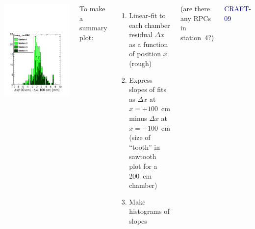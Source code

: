 \documentclass[compress]{beamer}
\begin{document}
\begin{frame}
\begin{columns}
\includegraphics[width=\linewidth]{sawtooth_low_norpc.pdf}

To make a summary plot:

\begin{enumerate}
\item Linear-fit to each chamber residual $\Delta x$ as a function of position $x$ (rough)

\item Express slopes of fits as $\Delta x$ at $x=+100$~cm minus
  $\Delta x$ at $x=-100$~cm \\ (size of ``tooth'' in sawtooth
  plot for a 200~cm chamber)

\item Make histograms of slopes
\end{enumerate}

\vspace{0.25 cm}
{\scriptsize (are there any RPCs in station~4?)}

\vspace{0.25 cm}
\hfill \textcolor{darkblue}{\scriptsize CRAFT-09}
\end{columns}
\end{frame}
\end{document}

